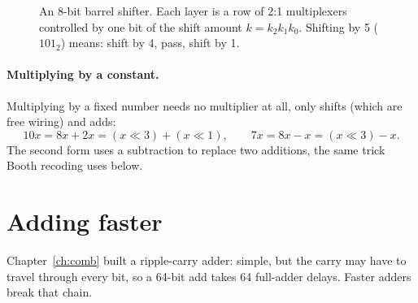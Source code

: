 \begin{figure}[h]
\centering
{}
\caption{An 8-bit barrel shifter. Each layer is a row of 2:1 multiplexers controlled by one bit of the shift amount $k = k_2k_1k_0$. Shifting by 5 ($101_2$) means: shift by 4, pass, shift by 1.}
\label{fig:barrel}
\end{figure}

\paragraph{Multiplying by a constant.} Multiplying by a fixed number needs no multiplier at all, only shifts (which are free wiring) and adds:
\[
  10x = 8x + 2x = (x \ll 3) + (x \ll 1), \qquad 7x = 8x - x = (x \ll 3) - x.
\]
The second form uses a subtraction to replace two additions, the same trick Booth recoding uses below.

\section{Adding faster}
\label{sec:fastadd}

Chapter~\ref{ch:comb} built a ripple-carry adder: simple, but the carry may have to travel through every bit, so a 64-bit add takes 64 full-adder delays. Faster adders break that chain.


